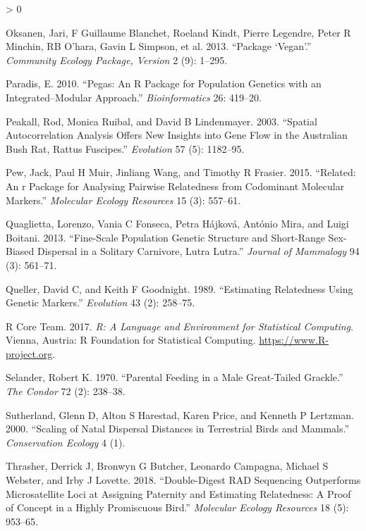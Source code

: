 \documentclass[
]{article}
\newlength{\cslhangindent}
\newenvironment{CSLReferences}[2] %
 {%
  \setlength{\parindent}{0pt}
  \ifodd #1 \everypar{\setlength{\hangindent}{\cslhangindent}}\ignorespaces\fi
  \ifnum #2 > 0
  \setlength{\parskip}{#2\baselineskip}
  \fi
 }%
 {}
\begin{document}
\begin{CSLReferences}{1}{0}
\leavevmode\hypertarget{ref-oksanen2013package}{}%
Oksanen, Jari, F Guillaume Blanchet, Roeland Kindt, Pierre Legendre,
Peter R Minchin, RB O'hara, Gavin L Simpson, et al. 2013. {``Package
{`Vegan'}.''} \emph{Community Ecology Package, Version} 2 (9): 1--295.

\leavevmode\hypertarget{ref-Paradis2010pegas}{}%
Paradis, E. 2010. {``Pegas: An {R} Package for Population Genetics with
an Integrated--Modular Approach.''} \emph{Bioinformatics} 26: 419--20.

\leavevmode\hypertarget{ref-peakall2003spatial}{}%
Peakall, Rod, Monica Ruibal, and David B Lindenmayer. 2003. {``Spatial
Autocorrelation Analysis Offers New Insights into Gene Flow in the
Australian Bush Rat, Rattus Fuscipes.''} \emph{Evolution} 57 (5):
1182--95.

\leavevmode\hypertarget{ref-pew2015related}{}%
Pew, Jack, Paul H Muir, Jinliang Wang, and Timothy R Frasier. 2015.
{``Related: An r Package for Analysing Pairwise Relatedness from
Codominant Molecular Markers.''} \emph{Molecular Ecology Resources} 15
(3): 557--61.

\leavevmode\hypertarget{ref-quaglietta2013fine}{}%
Quaglietta, Lorenzo, Vania C Fonseca, Petra Hájková, António Mira, and
Luigi Boitani. 2013. {``Fine-Scale Population Genetic Structure and
Short-Range Sex-Biased Dispersal in a Solitary Carnivore, Lutra
Lutra.''} \emph{Journal of Mammalogy} 94 (3): 561--71.

\leavevmode\hypertarget{ref-queller1989estimating}{}%
Queller, David C, and Keith F Goodnight. 1989. {``Estimating Relatedness
Using Genetic Markers.''} \emph{Evolution} 43 (2): 258--75.

\leavevmode\hypertarget{ref-rcoreteam}{}%
R Core Team. 2017. \emph{R: A Language and Environment for Statistical
Computing}. Vienna, Austria: R Foundation for Statistical Computing.
\url{https://www.R-project.org}.

\leavevmode\hypertarget{ref-selander1970parental}{}%
Selander, Robert K. 1970. {``Parental Feeding in a Male Great-Tailed
Grackle.''} \emph{The Condor} 72 (2): 238--38.

\leavevmode\hypertarget{ref-sutherland2000scaling}{}%
Sutherland, Glenn D, Alton S Harestad, Karen Price, and Kenneth P
Lertzman. 2000. {``Scaling of Natal Dispersal Distances in Terrestrial
Birds and Mammals.''} \emph{Conservation Ecology} 4 (1).

\leavevmode\hypertarget{ref-thrasher2018double}{}%
Thrasher, Derrick J, Bronwyn G Butcher, Leonardo Campagna, Michael S
Webster, and Irby J Lovette. 2018. {``Double-Digest RAD Sequencing
Outperforms Microsatellite Loci at Assigning Paternity and Estimating
Relatedness: A Proof of Concept in a Highly Promiscuous Bird.''}
\emph{Molecular Ecology Resources} 18 (5): 953--65.


\end{CSLReferences}
\end{document}
